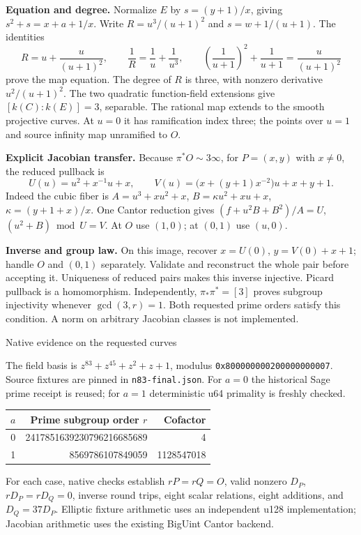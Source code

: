\documentclass[10pt]{article}
\newcommand{\inv}{\infty}
\begin{document}
\textbf{Equation and degree.}
Normalize $E$ by $s=(y+1)/x$, giving $s^2+s=x+a+1/x$. Write
$R=u^3/(u+1)^2$ and $s=w+1/(u+1)$. The identities
\[
 R=u+\frac{u}{(u+1)^2},\qquad
 \frac1R=\frac1u+\frac1{u^3},\qquad
 \left(\frac1{u+1}\right)^2+\frac1{u+1}=\frac{u}{(u+1)^2}
\]
prove the map equation. The degree of $R$ is three, with nonzero derivative
$u^2/(u+1)^2$. The two quadratic function-field extensions give
$[k(C):k(E)]=3$, separable. The rational map extends to the smooth projective
curves. At $u=0$ it has ramification index three; the points over $u=1$ and
source infinity map unramified to $O$.

\textbf{Explicit Jacobian transfer.}
Because $\pi^*O\sim3\inv$, for $P=(x,y)$ with $x\ne0$, the reduced pullback is
\[
 \boxed{U(u)=u^2+x^{-1}u+x,\qquad
 V(u)=\bigl(x+(y+1)x^{-2}\bigr)u+x+y+1.}
\]
Indeed the cubic fiber is $A=u^3+xu^2+x$,
$B=\kappa u^2+xu+x$, $\kappa=(y+1+x)/x$. One Cantor reduction gives
$(f+u^2B+B^2)/A=U$, $(u^2+B)\bmod U=V$.
At $O$ use $(1,0)$; at $(0,1)$ use $(u,0)$.

\textbf{Inverse and group law.}
On this image, recover $x=U(0)$, $y=V(0)+x+1$; handle $O$ and $(0,1)$
separately. Validate and reconstruct the whole pair before accepting it.
Uniqueness of reduced pairs makes this inverse injective. Picard pullback is
a homomorphism. Independently, $\pi_*\pi^*=[3]$ proves subgroup injectivity
whenever $\gcd(3,r)=1$. Both requested prime orders satisfy this condition.
A norm on arbitrary Jacobian classes is not implemented.

\newpage
{\Large Native evidence on the requested curves}

The field basis is $z^{83}+z^{45}+z^2+z+1$, modulus
\texttt{0x800000000200000000007}. Source fixtures are pinned in
\texttt{n83-final.json}. For $a=0$ the historical Sage prime receipt is reused;
for $a=1$ deterministic u64 primality is freshly checked.
\begin{center}
\begin{tabular}{crr}
\toprule $a$ & Prime subgroup order $r$ & Cofactor \\
\midrule
0 & 2417851639230796216685689 & 4\\
1 & 8569786107849059 & 1128547018\\
\bottomrule
\end{tabular}
\end{center}
For each case, native checks establish $rP=rQ=O$, valid nonzero $D_P$,
$rD_P=rD_Q=0$, inverse round trips, eight scalar relations, eight additions,
and $D_Q=37D_P$. Elliptic fixture arithmetic uses an independent u128
implementation; Jacobian arithmetic uses the existing BigUint Cantor backend.
\end{document}
